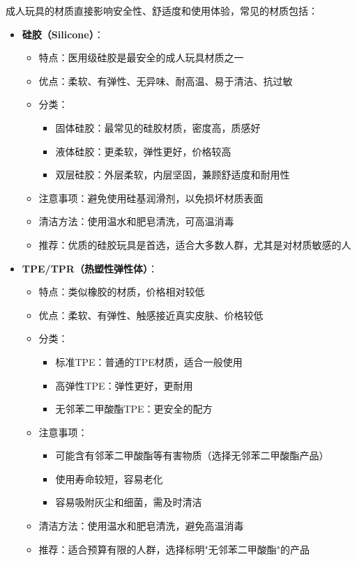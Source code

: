 \documentclass[12pt,UTF8]{ctexbook}
\begin{document}
成人玩具的材质直接影响安全性、舒适度和使用体验，常见的材质包括：

\begin{itemize}
	\item \textbf{硅胶（Silicone）}：
	\begin{itemize}
		\item 特点：医用级硅胶是最安全的成人玩具材质之一
		\item 优点：柔软、有弹性、无异味、耐高温、易于清洁、抗过敏
		\item 分类：
		\begin{itemize}
			\item 固体硅胶：最常见的硅胶材质，密度高，质感好
			\item 液体硅胶：更柔软，弹性更好，价格较高
			\item 双层硅胶：外层柔软，内层坚固，兼顾舒适度和耐用性
		\end{itemize}
		\item 注意事项：避免使用硅基润滑剂，以免损坏材质表面
		\item 清洁方法：使用温水和肥皂清洗，可高温消毒
		\item 推荐：优质的硅胶玩具是首选，适合大多数人群，尤其是对材质敏感的人
	\end{itemize}
	\item \textbf{TPE/TPR（热塑性弹性体）}：
	\begin{itemize}
		\item 特点：类似橡胶的材质，价格相对较低
		\item 优点：柔软、有弹性、触感接近真实皮肤、价格较低
		\item 分类：
		\begin{itemize}
			\item 标准TPE：普通的TPE材质，适合一般使用
			\item 高弹性TPE：弹性更好，更耐用
			\item 无邻苯二甲酸酯TPE：更安全的配方
		\end{itemize}
		\item 注意事项：
		\begin{itemize}
			\item 可能含有邻苯二甲酸酯等有害物质（选择无邻苯二甲酸酯产品）
			\item 使用寿命较短，容易老化
			\item 容易吸附灰尘和细菌，需及时清洁
		\end{itemize}
		\item 清洁方法：使用温水和肥皂清洗，避免高温消毒
		\item 推荐：适合预算有限的人群，选择标明"无邻苯二甲酸酯"的产品

\end{itemize}
\end{itemize}
\end{document}
